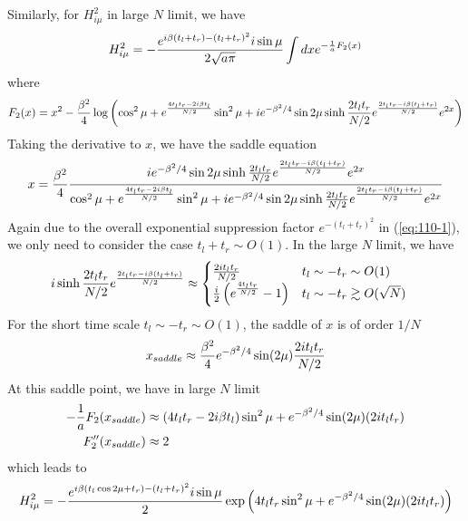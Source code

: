 \documentclass[11pt]{article}
\renewcommand{\>}{\rangle}
\newcommand{\<}{\langle}
\begin{document}
Similarly, for $H_{i\mu}^{2}$ in large $N$ limit, we have
\begin{equation}
H_{i\mu}^{2}=-\frac{e^{i\beta(t_{l}+t_{r})-(t_{l}+t_{r})^{2}}i\sin\mu}{2\sqrt{a\pi}}\int dxe^{-\frac{1}{a}F_{2}(x)}\label{eq:110-1}
\end{equation}
where 
\begin{equation}
F_{2}(x)=x^{2}-\frac{\beta^{2}}{4}\log\left(\cos^{2}\mu+e^{\frac{4t_{l}t_{r}-2i\beta t_{l}}{N/2}}\sin^{2}\mu+ie^{-\beta^{2}/4}\sin2\mu\sinh\frac{2t_{l}t_{r}}{N/2}e^{\frac{2t_{l}t_{r}-i\beta(t_{l}+t_{r})}{N/2}}e^{2x}\right)
\end{equation}
Taking the derivative to $x$, we have the saddle equation
\begin{equation}
x=\frac{\beta^{2}}{4}\frac{ie^{-\beta^{2}/4}\sin2\mu\sinh\frac{2t_{l}t_{r}}{N/2}e^{\frac{2t_{l}t_{r}-i\beta(t_{l}+t_{r})}{N/2}}e^{2x}}{\cos^{2}\mu+e^{\frac{4t_{l}t_{r}-2i\beta t_{l}}{N/2}}\sin^{2}\mu+ie^{-\beta^{2}/4}\sin2\mu\sinh\frac{2t_{l}t_{r}}{N/2}e^{\frac{2t_{l}t_{r}-i\beta(t_{l}+t_{r})}{N/2}}e^{2x}}\label{eq:112-1}
\end{equation}
Again due to the overall exponential suppression factor $e^{-(t_{l}+t_{r})^{2}}$
in (\ref{eq:110-1}), we only need to consider the case $t_{l}+t_{r}\sim O(1)$.
In the large $N$ limit, we have 
\begin{align}
i\sinh\frac{2t_{l}t_{r}}{N/2}e^{\frac{2t_{l}t_{r}-i\beta(t_{l}+t_{r})}{N/2}} & \approx\begin{cases}
\frac{2it_{l}t_{r}}{N/2} & t_{l}\sim-t_{r}\sim O(1)\\
\frac{i}{2}\left(e^{\frac{4t_{l}t_{r}}{N/2}}-1\right) & t_{l}\sim-t_{r}\gtrsim O(\sqrt{N})
\end{cases}\label{eq:113-1}
\end{align}
For the short time scale $t_{l}\sim-t_{r}\sim O(1)$, the saddle of
$x$ is of order $1/N$
\begin{equation}
x_{saddle}\approx\frac{\beta^{2}}{4}e^{-\beta^{2}/4}\sin(2\mu)\frac{2it_{l}t_{r}}{N/2}
\end{equation}
At this saddle point, we have in large $N$ limit
\begin{align}
-\frac{1}{a}F_{2}(x_{saddle}) & \approx(4t_{l}t_{r}-2i\beta t_{l})\sin^{2}\mu+e^{-\beta^{2}/4}\sin(2\mu)(2it_{l}t_{r})\\
F''_{2}(x_{saddle}) & \approx2
\end{align}
which leads to
\begin{equation}
H_{i\mu}^{2}=-\frac{e^{i\beta(t_{l}\cos2\mu+t_{r})-(t_{l}+t_{r})^{2}}i\sin\mu}{2}\exp\left(4t_{l}t_{r}\sin^{2}\mu+e^{-\beta^{2}/4}\sin(2\mu)(2it_{l}t_{r})\right)\label{eq:h2-short}
\end{equation}
\end{document}
